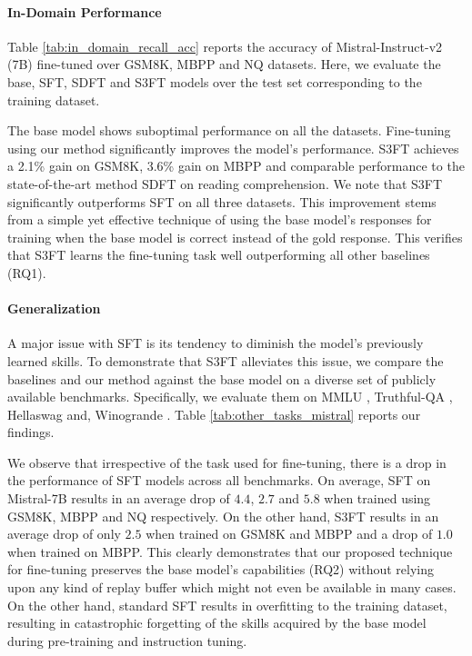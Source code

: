 \paragraph{In-Domain Performance}
\label{subsec:same_task_same_domain}


Table \ref{tab:in_domain_recall_acc} reports the accuracy of Mistral-Instruct-v2 (7B) fine-tuned over GSM8K, MBPP and NQ datasets. Here, we evaluate the base, SFT, SDFT and S3FT models over the test set corresponding to the training dataset.

The base model shows suboptimal performance on all the datasets.
Fine-tuning using our method significantly improves the model's performance. S3FT achieves a 2.1\% gain on GSM8K, 3.6\% gain on MBPP and comparable performance to the state-of-the-art method SDFT on reading comprehension. We note that S3FT significantly outperforms SFT on all three datasets. This improvement stems from a simple yet effective technique of using the base model's responses for training when the base model is correct instead of the gold response. This verifies that S3FT learns the fine-tuning task well outperforming all other baselines (RQ1). 
\vspace{0.2ex}
\paragraph{Generalization}

A major issue with SFT is its tendency to diminish the model's previously learned skills.
To demonstrate that S3FT alleviates this issue, we 
compare the baselines and our method against the base model on a diverse set of publicly available benchmarks. Specifically, we evaluate them on MMLU \cite{mmlu}, Truthful-QA \cite{truthfulqa}, Hellaswag \cite{hellaswag} and, Winogrande \cite{sakaguchi2019winogrande}. Table \ref{tab:other_tasks_mistral} reports our findings. 

We observe that irrespective of the task used for fine-tuning, there is a drop in the performance of SFT models across all benchmarks. 
On average, SFT on Mistral-7B results in an average drop of $4.4$, $2.7$ and $5.8$ when trained using GSM8K, MBPP and NQ respectively. 
On the other hand, S3FT results in an average drop of only $2.5$ when trained on GSM8K and MBPP and a drop of $1.0$ when trained on MBPP.
This clearly demonstrates that our proposed technique for fine-tuning preserves the base model's capabilities (RQ2) without relying upon any kind of replay buffer which might not even be available in many cases. On the other hand, standard SFT results in overfitting to the training dataset, resulting in catastrophic forgetting of the skills acquired by the base model during pre-training and instruction tuning. 
